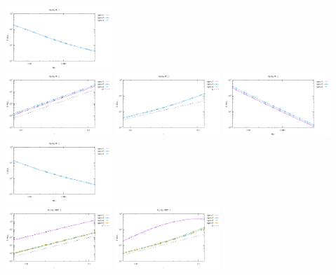 \begin{center}
\includegraphics[width=4cm]{python_codes/fieldstone_120/results/RT1Q0-pressure-Nfem.pdf}
\\
\includegraphics[width=4cm]{python_codes/fieldstone_120/results/RT2Q0-velocity-h.pdf}
\includegraphics[width=4cm]{python_codes/fieldstone_120/results/RT2Q0-pressure-h.pdf}
\includegraphics[width=4cm]{python_codes/fieldstone_120/results/RT2Q0-velocity-Nfem.pdf}
\includegraphics[width=4cm]{python_codes/fieldstone_120/results/RT2Q0-pressure-Nfem.pdf}
\\
\includegraphics[width=4cm]{python_codes/fieldstone_120/results/DSSY1Q0-velocity-h.pdf}
\includegraphics[width=4cm]{python_codes/fieldstone_120/results/DSSY1Q0-pressure-h.pdf}

\end{center}
